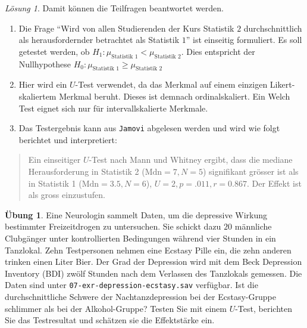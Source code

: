 \documentclass[
]{book}
\providecommand{\tightlist}{%
  \setlength{\itemsep}{0pt}\setlength{\parskip}{0pt}}
\theoremstyle{definition}
\theoremstyle{definition}
\theoremstyle{definition}
\newtheorem{exercise}{Übung}[chapter]
\theoremstyle{definition}
\theoremstyle{remark}
\newtheorem*{solution}{Lösung}
\begin{document}
\begin{solution}
Damit können die Teilfragen beantwortet werden.

\begin{enumerate}
\def\labelenumi{\alph{enumi})}
\tightlist
\item
  Die Frage ``Wird von allen Studierenden der Kurs Statistik \(2\) durchschnittlich als herausfordernder betrachtet als Statistik \(1\)'' ist einseitig formuliert. Es soll getestet werden, ob \(H_1: \mu_\text{Statistik 1} < \mu_\text{Statistik 2}\). Dies entspricht der Nullhypothese \(H_0: \mu_\text{Statistik 1} \geq \mu_\text{Statistik 2}\)
\item
  Hier wird ein \(U\)-Test verwendet, da das Merkmal auf einem einzigen Likert-skaliertem Merkmal beruht. Dieses ist demnach ordinalskaliert. Ein Welch Test eignet sich nur für intervallskalierte Merkmale.
\item
  Das Testergebnis kann aus \texttt{Jamovi} abgelesen werden und wird wie folgt berichtet und interpretiert:
\end{enumerate}

\begin{quote}
Ein einseitiger \(U\)-Test nach Mann und Whitney ergibt, dass die mediane Herausforderung in Statistik 2 (\(\text{Mdn}=7, N = 5\)) signifikant grösser ist als in Statistik 1 (\(\text{Mdn}= 3.5, N =6\)), \(U = 2, p = .011, r = 0.867\). Der Effekt ist als gross einzustufen.
\end{quote}

\end{solution}

\begin{exercise}
\protect\hypertarget{exr:depression-ecstasy}{}\label{exr:depression-ecstasy}Eine Neurologin sammelt Daten, um die depressive Wirkung bestimmter Freizeitdrogen zu untersuchen. Sie schickt dazu \(20\) männliche Clubgänger unter kontrollierten Bedingungen während vier Stunden in ein Tanzlokal. Zehn Testpersonen nehmen eine Ecstasy Pille ein, die zehn anderen trinken einen Liter Bier. Der Grad der Depression wird mit dem Beck Depression Inventory (BDI) zwölf Stunden nach dem Verlassen des Tanzlokals gemessen. Die Daten sind unter \texttt{07-exr-depression-ecstasy.sav} verfügbar. Ist die durchschnittliche Schwere der Nachtanzdepression bei der Ecstasy-Gruppe schlimmer als bei der Alkohol-Gruppe? Testen Sie mit einem \(U\)-Test, berichten Sie das Testresultat und schätzen sie die Effektstärke ein.
\end{exercise}
\end{document}
